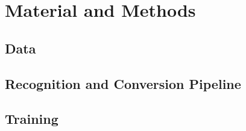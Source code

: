 \chapter{Material and Methods}

\section{Data}


\section{Recognition and Conversion Pipeline}


\section{Training}

